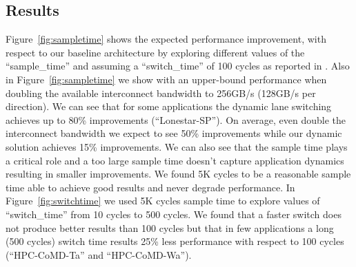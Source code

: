  \subsection{Results}
Figure~\ref{fig:sampletime} shows the expected performance improvement, with 
respect to our baseline architecture by exploring different values 
of the ``sample\_time'' and assuming a ``switch\_time'' of 100 cycles 
as reported in \cite{REALLY_NEED_REF_HERE}. Also in Figure~\ref{fig:sampletime}
we show with an upper-bound performance when doubling
the available interconnect bandwidth to 256GB/s (128GB/s per direction). 
We can see that for some applications the dynamic lane switching achieves up to
80\% improvements (``Lonestar-SP''). On average, even double the interconnect 
bandwidth we expect to see 50\% improvements while our dynamic solution 
achieves 15\% improvements. We can also see that the sample time plays a 
critical role and a too large sample time doesn't capture application dynamics 
resulting in smaller improvements. We found 5K cycles to be a reasonable sample
time able to achieve good results and never degrade performance. 
In Figure~\ref{fig:switchtime} we used 5K cycles sample time to
explore values of ``switch\_time'' from 10 cycles to 500 cycles.
We found that a faster switch does not produce better results than 100 cycles
but that in few applications a long (500 cycles) switch time results 25\% 
less performance with respect to 100 cycles (``HPC-CoMD-Ta'' and 
``HPC-CoMD-Wa'').









